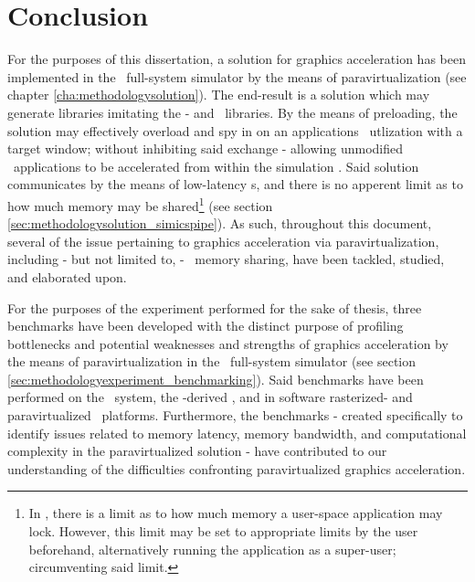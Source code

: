 
\chapter{Conclusion}
\label{cha:conclusion}




For the purposes of this dissertation, a solution for graphics acceleration has been implemented in the \dvttermsimics\ full-system simulator by the means of paravirtualization (see chapter \ref{cha:methodologysolution}).
The end-result is a solution which may generate libraries imitating the \dvttermegl - and \dvttermopenglestwopointo\ libraries.
By the means of preloading, the solution may effectively overload and spy in on an applications \dvttermegl\ utlization with a target window; without inhibiting said exchange - allowing unmodified \dvttermopengl\ applications to be accelerated from within the simulation \dvttermtarget .
Said solution communicates by the means of low-latency \dvttermmagicinstruction s, and there is no apperent limit as to how much memory may be shared\footnote{In \dvttermlinux , there is a limit as to how much memory a user-space application may lock. However, this limit may be set to appropriate limits by the user beforehand, alternatively running the application as a super-user; circumventing said limit.} (see section \ref{sec:methodologysolution_simicspipe}).
As such, throughout this document, several of the issue pertaining to graphics acceleration via paravirtualization, including - but not limited to, \dvttermtarget - \dvttermhost\ memory sharing, have been tackled, studied, and elaborated upon.

For the purposes of the experiment performed for the sake of thesis, three benchmarks have been developed with the distinct purpose of profiling bottlenecks and potential weaknesses and strengths of graphics acceleration by the means of paravirtualization in the \dvttermsimics\ full-system simulator (see section \ref{sec:methodologyexperiment_benchmarking}).
Said benchmarks have been performed on the \dvttermhost\ system, the \dvttermqemu -derived \dvttermandroidemulator , and in software rasterized- and paravirtualized \dvttermsimics\ platforms.
Furthermore, the benchmarks - created specifically to identify issues related to memory latency, memory bandwidth, and computational complexity in the paravirtualized solution - have contributed to our understanding of the difficulties confronting paravirtualized graphics acceleration.

